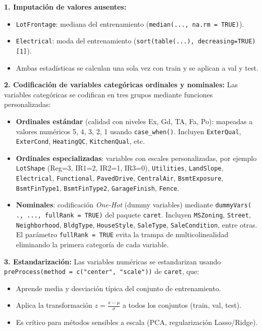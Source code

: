 \documentclass[a4paper,twocolumn]{article}
\begin{document}
	\textbf{1. Imputación de valores ausentes:}
	\begin{itemize}
	  \item \texttt{LotFrontage}: mediana del entrenamiento (\texttt{median(..., na.rm = TRUE)}).
	  \item \texttt{Electrical}: moda del entrenamiento (\texttt{sort(table(...), decreasing=TRUE)[1]}).
	  \item Ambas estadísticas se calculan una sola vez con train y se aplican a val y test.
	\end{itemize}

	\vspace{0.2cm}

	\textbf{2. Codificación de variables categóricas ordinales y nominales:}
	Las variables categóricas se codifican en tres grupos mediante funciones personalizadas:

	\begin{itemize}
	  \item \textbf{Ordinales estándar} (calidad con niveles Ex, Gd, TA, Fa, Po): mapeadas a valores numéricos 5, 4, 3, 2, 1 usando \texttt{case\_when()}. Incluyen \texttt{ExterQual}, \texttt{ExterCond}, \texttt{HeatingQC}, \texttt{KitchenQual}, etc.
	  
	  \item \textbf{Ordinales especializadas}: variables con escales personalizadas, por ejemplo \texttt{LotShape} (Reg=3, IR1=2, IR2=1, IR3=0), \texttt{Utilities}, \texttt{LandSlope}, \texttt{Electrical}, \texttt{Functional}, \texttt{PavedDrive}, \texttt{CentralAir}, \texttt{BsmtExposure}, \texttt{BsmtFinType1}, \texttt{BsmtFinType2}, \texttt{GarageFinish}, \texttt{Fence}.
	  
	  \item \textbf{Nominales}: codificación \textit{One-Hot} (dummy variables) mediante \texttt{dummyVars(~ ., ..., fullRank = TRUE)} del paquete \texttt{caret}. Incluyen \texttt{MSZoning}, \texttt{Street}, \texttt{Neighborhood}, \texttt{BldgType}, \texttt{HouseStyle}, \texttt{SaleType}, \texttt{SaleCondition}, entre otras. El parámetro \texttt{fullRank = TRUE} evita la trampa de multicolinealidad eliminando la primera categoría de cada variable.
	\end{itemize}

	\vspace{0.2cm}

	\textbf{3. Estandarización:}
	Las variables numéricas se estandarizan usando \texttt{preProcess(method = c("center", "scale"))} de \texttt{caret}, que:
	\begin{itemize}
	  \item Aprende media y desviación típica del conjunto de entrenamiento.
	  \item Aplica la transformación $z = \frac{x - \mu}{\sigma}$ a todos los conjuntos (train, val, test).
	  \item Es crítico para métodos sensibles a escala (PCA, regularización Lasso/Ridge).
	\end{itemize}
\end{document}

